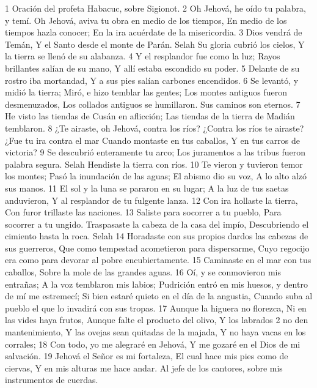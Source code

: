 1 Oración del profeta Habacuc, sobre Sigionot.
2 Oh Jehová, he oído tu palabra, y temí.
Oh Jehová, aviva tu obra en medio de los tiempos,
En medio de los tiempos hazla conocer;
En la ira acuérdate de la misericordia.
3 Dios vendrá de Temán,
Y el Santo desde el monte de Parán. Selah
Su gloria cubrió los cielos,
Y la tierra se llenó de su alabanza.
4 Y el resplandor fue como la luz;
Rayos brillantes salían de su mano,
Y allí estaba escondido su poder.
5 Delante de su rostro iba mortandad,
Y a sus pies salían carbones encendidos.
6 Se levantó, y midió la tierra;
Miró, e hizo temblar las gentes;
Los montes antiguos fueron desmenuzados,
Los collados antiguos se humillaron.
Sus caminos son eternos.
7 He visto las tiendas de Cusán en aflicción;
Las tiendas de la tierra de Madián temblaron.
8 ¿Te airaste, oh Jehová, contra los ríos?
¿Contra los ríos te airaste?
¿Fue tu ira contra el mar
Cuando montaste en tus caballos,
Y en tus carros de victoria?
9 Se descubrió enteramente tu arco;
Los juramentos a las tribus fueron palabra segura. Selah
Hendiste la tierra con ríos.
10 Te vieron y tuvieron temor los montes;
Pasó la inundación de las aguas;
El abismo dio su voz,
A lo alto alzó sus manos.
11 El sol y la luna se pararon en su lugar;
A la luz de tus saetas anduvieron,
Y al resplandor de tu fulgente lanza.
12 Con ira hollaste la tierra,
Con furor trillaste las naciones.
13 Saliste para socorrer a tu pueblo,
Para socorrer a tu ungido.
Traspasaste la cabeza de la casa del impío,
Descubriendo el cimiento hasta la roca. Selah
14 Horadaste con sus propios dardos las cabezas de sus guerreros,
Que como tempestad acometieron para dispersarme,
Cuyo regocijo era como para devorar al pobre encubiertamente.
15 Caminaste en el mar con tus caballos,
Sobre la mole de las grandes aguas.
16 Oí, y se conmovieron mis entrañas;
A la voz temblaron mis labios;
Pudrición entró en mis huesos, y dentro de mí me estremecí; 
Si bien estaré quieto en el día de la angustia,
Cuando suba al pueblo el que lo invadirá con sus tropas.
17 Aunque la higuera no florezca,
Ni en las vides haya frutos,
Aunque falte el producto del olivo,
Y los labrados
2 no den mantenimiento,
Y las ovejas sean quitadas de la majada,
Y no haya vacas en los corrales;
18 Con todo, yo me alegraré en Jehová,
Y me gozaré en el Dios de mi salvación.
19 Jehová el Señor es mi fortaleza,
El cual hace mis pies como de ciervas, 
Y en mis alturas me hace andar. 
Al jefe de los cantores, sobre mis instrumentos de cuerdas.

